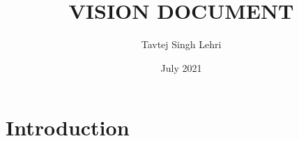 \documentclass{article}
\title{VISION DOCUMENT}
\author{Tavtej Singh Lehri}
\date{July 2021}
\begin{document}
\maketitle

\section{Introduction}
\end{document}
